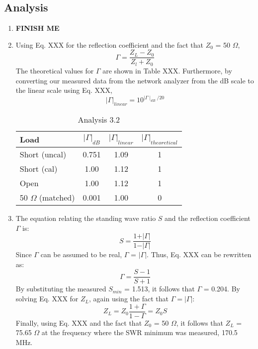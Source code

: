 \documentclass{article}
\begin{document}
\subsection{Analysis}
\begin{enumerate}
	\item \textbf{FINISH ME}
	
	\item Using Eq. XXX for the reflection coefficient and the fact that $Z_0$ = 50 $\Omega$,
	\begin{equation}
		\Gamma = \frac{Z_L-Z_0}{Z_l+Z_0}
	\end{equation}
	The theoretical values for $\Gamma$ are shown in Table XXX. Furthermore, by converting our measured data from the network analyzer from the dB scale to the linear scale using Eq. XXX,
	\begin{equation}
		\vert\Gamma\vert_{linear} = 10^{\mid\Gamma\mid_{dB}/20}
	\end{equation}
	
	\begin{table}[h]
	\centering
		\begin{tabular}{|l|c|c|c|}
		\hline
		\textbf{Load}     & $\vert\Gamma\vert_{dB}$ & $\vert\Gamma\vert_{linear}$ & $\vert\Gamma\vert_{theoretical}$ \\ \hline
		Short (uncal)     & 0.751 	  & 1.09      &    1      \\ \hline
		Short (cal)       & 1.00      & 1.12      &    1      \\ \hline
		Open              & 1.00  	  & 1.12      &    1      \\ \hline
		50 $\Omega$ (matched) & 0.001 & 1.00  	  &    0      \\ \hline
		\end{tabular}
		\caption{Analysis 3.2}
		\label{}
	\end{table}	

	\item The equation relating the standing wave ratio $S$ and the reflection coefficient $\Gamma$ is:
	\begin{equation} 
		S = \frac{1 + \vert\Gamma\vert}{1 - \vert\Gamma\vert}
	\end{equation}
	Since $\Gamma$ can be assumed to be real, $\Gamma$ = $\vert\Gamma\vert$. Thus, Eq. XXX can be rewritten as:
	\begin{equation}
		\Gamma = \frac{S - 1}{S + 1}
	\end{equation}
	By substituting the measured $S_{min}$ = 1.513, it follows that $\Gamma$ = 0.204. By solving Eq. XXX for $Z_L$, again using the fact that $\Gamma = \vert\Gamma\vert$:
	\begin{equation}
		Z_L = Z_0\frac{1 + \Gamma}{1 - \Gamma} = Z_0 S
	\end{equation}	 
	Finally, using Eq. XXX and the fact that $Z_0$ = 50 $\Omega$, it follows that $Z_L$ = 75.65 $\Omega$ at the frequency where the SWR minimum was measured, 170.5 MHz.
\end{enumerate}
\end{document}
